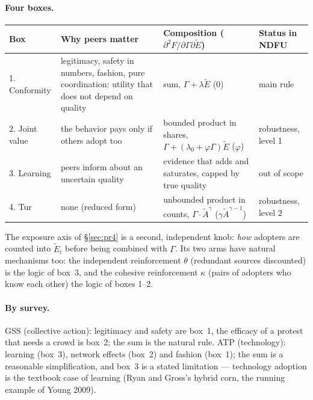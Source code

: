 \documentclass[11pt,a4paper]{article}
\newcommand{\Ee}{\tilde{E}}                 %
\newcommand{\Acount}{\tilde{A}}             %
\begin{document}
\paragraph{Four boxes.}
\begin{center}
\small
\begin{tabularx}{\textwidth}{@{}l>{\raggedright\arraybackslash}X>{\raggedright\arraybackslash}X>{\raggedright\arraybackslash}p{3.1cm}@{}}
\toprule
Box & Why peers matter & Composition ($\partial^2F/\partial\Gamma\partial\Ee$) & Status in NDFU \\
\midrule
1. Conformity & legitimacy, safety in numbers, fashion, pure coordination: utility that does not depend on quality & sum, $\Gamma + \lambda\Ee$ (0) & main rule \\
2. Joint value & the behavior pays only if others adopt too & bounded product in shares, $\Gamma + (\lambda_0 + \varphi\Gamma)\Ee$ ($\varphi$) & robustness, level 1 \\
3. Learning & peers inform about an uncertain quality & evidence that adds and saturates, capped by true quality & out of scope \\
4. Tur & none (reduced form) & unbounded product in counts, $\Gamma\cdot\Acount^{\gamma}$ ($\gamma\Acount^{\gamma-1}$) & robustness, level 2 \\
\bottomrule
\end{tabularx}
\end{center}
The exposure axis of \S\ref{sec:pr4} is a second, independent knob: \emph{how} adopters are
counted into $\Ee_i$ before being combined with $\Gamma$. Its two arms have natural
mechanisms too: the independent reinforcement $\theta$ (redundant sources discounted) is the
logic of box~3, and the cohesive reinforcement $\kappa$ (pairs of adopters who know each
other) the logic of boxes 1--2.

\paragraph{By survey.} GSS (collective action): legitimacy and safety are box~1, the
efficacy of a protest that needs a crowd is box~2; the sum is the natural rule. ATP
(technology): learning (box~3), network effects (box~2) and fashion (box~1); the sum is a
reasonable simplification, and box~3 is a stated limitation --- technology adoption is the
textbook case of learning (Ryan and Gross's hybrid corn, the running example of Young 2009).
\end{document}
